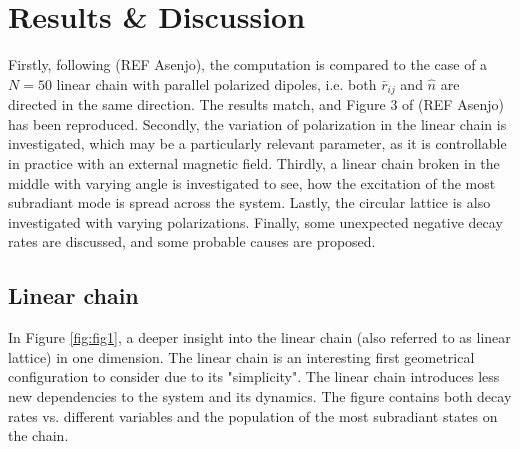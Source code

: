 \documentclass{article}
\begin{document}
\section{Results \& Discussion}

Firstly, following (REF Asenjo), the computation is compared to the case of a $N=50$ linear chain with parallel polarized dipoles, i.e. both $\bar{r}_{ij}$ and $\hat{n}$ are directed in the same direction. The results match, and Figure 3 of (REF Asenjo) has been reproduced. Secondly, the variation of polarization in the linear chain is investigated, which may be a particularly relevant parameter, as it is controllable in practice with an external magnetic field. Thirdly, a linear chain broken in the middle with varying angle is investigated to see, how the excitation of the most subradiant mode is spread across the system. Lastly, the circular lattice is also investigated with varying polarizations. Finally, some unexpected negative decay rates are discussed, and some probable causes are proposed. 

\subsection{Linear chain}\label{disc:linear_chain}

In Figure \ref{fig:fig1}, a deeper insight into the linear chain (also referred to as linear lattice) in one dimension. The linear chain is an interesting first geometrical configuration to consider due to its "simplicity". The linear chain introduces less new dependencies to the system and its dynamics. The figure contains both decay rates vs. different variables and the population of the most subradiant states on the chain. 
\end{document}
